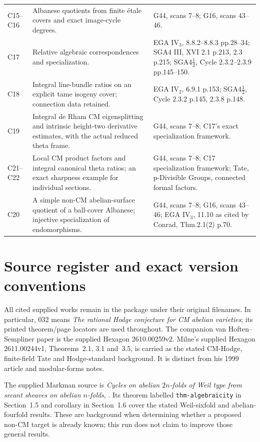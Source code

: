 \begin{longtable}{@{}p{.18\linewidth}p{.48\linewidth}p{.27\linewidth}@{}}
C15--C16 & Albanese quotients from finite \'etale covers and exact image-cycle degrees. & G44, scans 7--8; G16, scans 43--46.\\
C17 & Relative algebraic correspondences and specialization. & EGA IV$_3$, 8.8.2--8.8.3 pp.28--34; SGA4 III, XVI 2.1 p.213, 2.3 p.215; SGA4$\frac12$, Cycle 2.3.2--2.3.9 pp.145--150.\\
C18 & Integral line-bundle ratios on an explicit tame isogeny cover; connection data retained. & EGA IV$_2$, 6.9.1 p.153; SGA4$\frac12$, Cycle 2.3.2 p.145, 2.3.8 p.148.\\
C19 & Integral de Rham CM eigensplitting and intrinsic height-two derivative estimates, with the actual reduced theta frame. & G44, scans 7--8; C17's exact specialization framework.\\
C21--C22 & Local CM product factors and integral canonical theta ratios; an exact sharpness example for individual sections. & G44, scans 7--8; C17 specialization framework; Tate, p-Divisible Groups, connected formal factors.\\
C20 & A simple non-CM abelian-surface quotient of a ball-cover Albanese; injective specialization of endomorphisms. & G44, scans 7--8; G16, scans 43--46; EGA IV$_3$, 11.10 as cited by Conrad, Thm.2.1(2) p.70.\\
\bottomrule
\end{longtable}

\section{Source register and exact version conventions}

All cited supplied works remain in the package under their original
filenames. In particular, 032 means
\emph{The rational Hodge conjecture for CM abelian varieties}; its
printed theorem/page locators are used throughout. The companion
van Hoften--Sempliner paper is the supplied Hexagon 2610.00259v2.
Milne's supplied Hexagon 2611.00244v1, Theorems~2.1, 3.1 and~3.5,
is carried as the stated CM-Hodge, finite-field Tate and Hodge-standard
background. It is distinct from his 1999 article and modular-forms notes.

The supplied Markman source is \emph{Cycles on abelian $2n$-folds of
Weil type from secant sheaves on abelian $n$-folds},
.
Its theorem labelled \texttt{thm-algebraicity} in Section~1.5 and
corollary in Section~1.6 cover the stated Weil-sixfold and
abelian-fourfold results. These are background when determining
whether a proposed non-CM target is already known; this run does
not claim to improve those general results.

